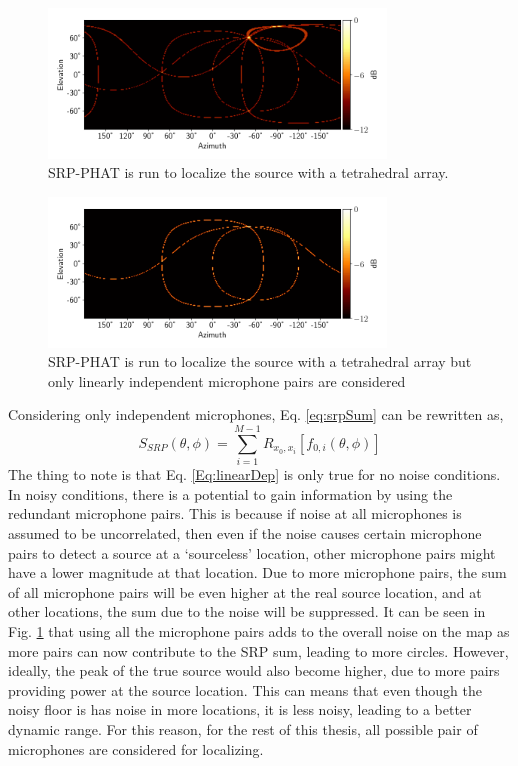 \begin{figure}[!ht]
    \centering
    \includegraphics[width=0.8\textwidth]{Figures/4mic1srcRes.png}
    \caption{SRP-PHAT is run to localize the source with a tetrahedral array.}
    \label{fig:4mic1src}
\end{figure}
\begin{figure}[!ht]
    \centering
    \includegraphics[width=0.8\textwidth]{Figures/Ind4mic1srcRes.png}
    \caption{SRP-PHAT is run to localize the source with a tetrahedral array but only linearly independent microphone pairs are considered}
    \label{fig:4mic1srcInd}
\end{figure}
Considering only independent microphones, Eq. \ref{eq:srpSum} can be rewritten as,
\begin{equation}
    S_{SRP}(\theta,\phi)=\sum\limits_{i=1}^{M-1}{R_{x_0,x_i}[f_{0,i}(\theta,\phi)]}
     \label{eq:srpSumInd}
\end{equation}
The thing to note is that Eq. \ref{Eq:linearDep} is only true for no noise conditions. In noisy conditions, there is a potential to gain information by using the redundant microphone pairs. This is because if noise at all microphones is assumed to be uncorrelated, then even if the noise causes certain microphone pairs to detect a source at a `sourceless' location, other microphone pairs might have a lower magnitude at that location. Due to more microphone pairs, the sum of all microphone pairs will be even higher at the real source location, and at other locations, the sum due to the noise will be suppressed. It can be seen in Fig. \ref{fig:4mic1src} that using all the microphone pairs adds to the overall noise on the map as more pairs can now contribute to the SRP sum, leading to more circles. However, ideally, the peak of the true source would also become higher, due to more pairs providing power at the source location. This can means that even though the noisy floor is has noise in more locations, it is less noisy, leading to a better dynamic range. For this reason, for the rest of this thesis, all possible pair of microphones are considered for localizing.
